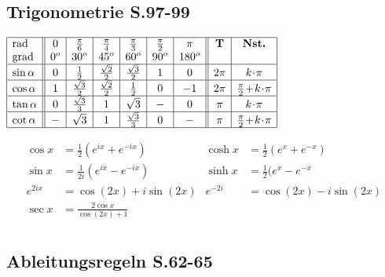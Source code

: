 \subsection{Trigonometrie \texorpdfstring{ \hfill S.97-99}{S.97-99}}
\vspace{2pt}
\renewcommand{\arraystretch}{2}
$
\begin{array}{|l||c|c|c|c|c|c||c|c|}
    \hline
    \textrm{rad} & 0 & \frac{\pi}{6} & \frac{\pi}{4} & \frac{\pi}{3} & \frac{\pi}{2} & \pi & \textrm{\textbf{T}} & \textrm{\textbf{Nst.}}  \\
    \grad & 0^o & 30^o & 45^o & 60^o & 90^o & 180^o & &  \\
    \hline 
    \sin\alpha & 0 & \frac{1}{2} & \frac{\sqrt{2}}{2} & \frac{\sqrt{3}}{2} & 1 & 0 & 2\pi & k\!\cdot\!\pi \\
    \hline 
    \cos{\alpha} & 1 & \frac{\sqrt{3}}{2} & \frac{\sqrt{2}}{2} & \frac{1}{2} & 0 & -1 & 2\pi & \frac{\pi}{2}\!+\!k\!\cdot \!\pi \\
    \hline 
    \tan \alpha & 0 & \frac{\sqrt{3}}{3} & 1 & \sqrt{3} & - & 0 & \pi & k\!\cdot \! \pi \\
    \hline 
    \cot \alpha & - & \sqrt{3} & 1 & \frac{\sqrt{3}}{3} & 0 & - & \pi & \frac{\pi}{2}\!+\!k\!\cdot \!\pi \\
    \hline 
\end{array}
$

\begin{align*}
    \cos x &= \frac{1}{2}(e^{ix} + e^{-ix}) & \cosh x &= \frac{1}{2}(e^x + e^{-x}) \\
    \sin x &= \frac{1}{2i}(e^{ix} - e^{-ix}) & \sinh x &= \frac{1}{2}(e^x - e^{-x} \\
    e^{2ix} &= \cos(2x)\!+\! i\sin(2x) & e^{-2i} &= \cos(2x)\!-\!i\sin(2x) \\
    \sec x &= \frac{2 \cos x}{\cos(2x) + 1} && \\ 
\end{align*}



\subsection{Ableitungsregeln \texorpdfstring{\hfill S.62-65}{S.62-65}}
        
